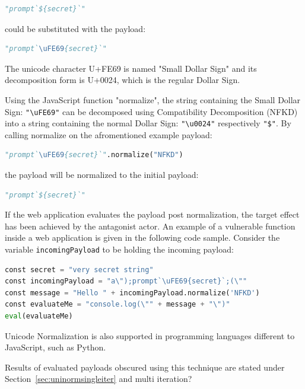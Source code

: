\begin{lstlisting}[style=basicStyle, language=Python]
"prompt`${secret}`"
\end{lstlisting}

could be substituted with the payload:

\begin{lstlisting}[style=basicStyle, language=Python]
"prompt`\uFE69{secret}`"
\end{lstlisting}

The unicode character U+FE69 is named "Small Dollar Sign" and its decomposition form is U+0024, which is the regular Dollar Sign. \cite{comp/uni}

Using the JavaScript function "normalize", the string containing the Small Dollar Sign: \verb|"\uFE69"| can be decomposed using Compatibility Decomposition (NFKD) into a string containing the normal Dollar Sign: \verb|"\u0024"| respectively \verb|"$"|.
By calling normalize on the afromentioned example payload:

\begin{lstlisting}[style=basicStyle, language=Python]
"prompt`\uFE69{secret}`".normalize("NFKD")
\end{lstlisting}

the payload will be normalized to the initial payload:

\begin{lstlisting}[style=basicStyle, language=Python]
"prompt`${secret}`"
\end{lstlisting}

If the web application evaluates the payload post normalization, the target effect has been achieved by the antagonist actor. An example of a vulnerable function inside a web application is given in the following code sample. Consider the variable \verb|incomingPayload| to be holding the incoming payload:

\begin{lstlisting}[style=basicStyle, language=Python]
const secret = "very secret string"
const incomingPayload = "a\");prompt`\uFE69{secret}`;(\""
const message = "Hello " + incomingPayload.normalize('NFKD')
const evaluateMe = "console.log(\"" + message + "\")"
eval(evaluateMe)
\end{lstlisting}

Unicode Normalization is also supported in programming languages different to JavaScript, such as Python. \cite{python/normalization}

Results of evaluated payloads obscured using this technique are stated under Section~\ref{sec:uninormsingleiter} and {\color{red} multi iteration?}


